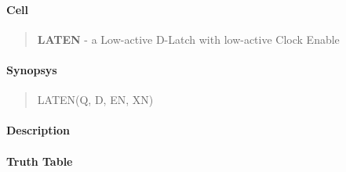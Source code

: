 \label{LATEN}
\paragraph{Cell}
\begin{quote}
    \textbf{LATEN} - a Low-active D-Latch with low-active Clock Enable
\end{quote}

\paragraph{Synopsys}
\begin{quote}
    LATEN(Q, D, EN, XN)
\end{quote}

\paragraph{Description}

%

\paragraph{Truth Table}
%

